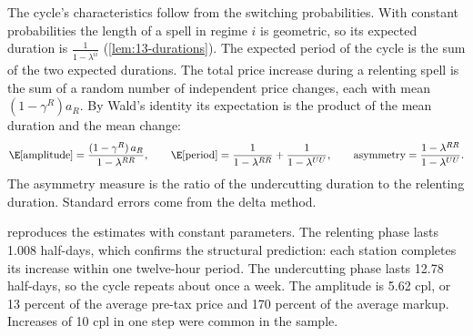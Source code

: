 The cycle's characteristics follow from the switching probabilities. With constant probabilities the length of a
spell in regime $i$ is geometric, so its expected duration is $\frac{1}{1-\lambda^{ii}}$ (\cref{lem:13-durations}).
The expected period of the cycle is the sum of the two expected durations. The total price increase during a
relenting spell is the sum of a random number of independent price changes, each with mean $(1-\gamma^R)a_R$.
By Wald's identity its expectation is the product of the mean duration and the mean change:
\begin{equation}\label{eq:13-noel-amplitude}
\E[\text{amplitude}]=\frac{(1-\gamma^R)\,a_R}{1-\lambda^{RR}},\qquad
\E[\text{period}]=\frac{1}{1-\lambda^{RR}}+\frac{1}{1-\lambda^{UU}},\qquad
\text{asymmetry}=\frac{1-\lambda^{RR}}{1-\lambda^{UU}} .
\end{equation}
The asymmetry measure is the ratio of the undercutting duration to the relenting duration. Standard errors come
from the delta method.

 reproduces the estimates with constant parameters. The relenting phase lasts 1.008 half-days,
which confirms the structural prediction: each station completes its increase within one twelve-hour period. The
undercutting phase lasts 12.78 half-days, so the cycle repeats about once a week. The amplitude is 5.62 cpl, or 13
percent of the average pre-tax price and 170 percent of the average markup. Increases of 10 cpl in one step were
common in the sample.

